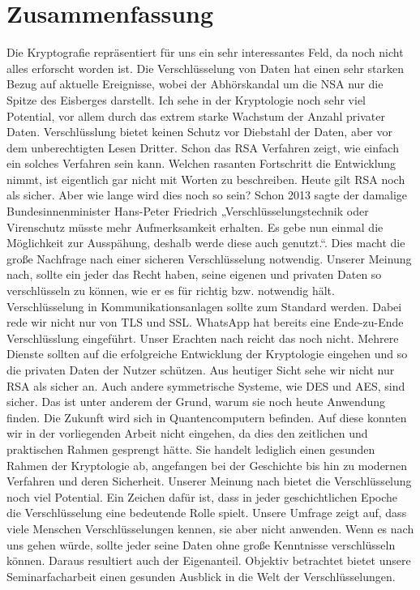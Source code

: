 \chapter{Zusammenfassung}
Die Kryptografie repräsentiert für uns ein sehr interessantes Feld, da noch nicht alles erforscht worden ist. Die Verschlüsselung von Daten hat einen sehr starken Bezug auf aktuelle Ereignisse, wobei der Abhörskandal um die NSA nur die Spitze des Eisberges darstellt. Ich sehe in der Kryptologie noch sehr viel Potential, vor allem durch das extrem starke Wachstum der Anzahl privater Daten. Verschlüsslung bietet keinen Schutz vor Diebstahl der Daten, aber vor dem unberechtigten Lesen Dritter. Schon das RSA Verfahren zeigt, wie einfach ein solches Verfahren sein kann. Welchen rasanten Fortschritt die Entwicklung nimmt, ist eigentlich gar nicht mit Worten zu beschreiben. Heute gilt RSA noch als sicher. Aber wie lange wird dies noch so sein? Schon 2013 sagte der damalige Bundesinnenminister Hans-Peter Friedrich „Verschlüsselungstechnik oder Virenschutz müsste mehr Aufmerksamkeit erhalten. Es gebe nun einmal die Möglichkeit zur Ausspähung, deshalb werde diese auch genutzt.“. Dies macht die große Nachfrage nach einer sicheren Verschlüsselung notwendig. Unserer Meinung nach, sollte ein jeder das Recht haben, seine eigenen und privaten Daten so verschlüsseln zu können, wie er es für richtig bzw. notwendig hält. Verschlüsselung in Kommunikationsanlagen sollte zum Standard werden. Dabei rede wir nicht nur von TLS und SSL. WhatsApp hat bereits eine Ende-zu-Ende Verschlüsslung eingeführt. Unser Erachten nach reicht das noch nicht. Mehrere Dienste sollten auf die erfolgreiche Entwicklung der Kryptologie eingehen und so die privaten Daten der Nutzer schützen. Aus heutiger Sicht sehe wir nicht nur RSA als sicher an. Auch andere symmetrische Systeme, wie DES und AES, sind sicher. Das ist unter anderem der Grund, warum sie noch heute Anwendung finden. Die Zukunft wird sich in Quantencomputern befinden. Auf diese konnten wir in der vorliegenden Arbeit nicht eingehen, da dies den zeitlichen und praktischen Rahmen gesprengt hätte. Sie handelt lediglich einen gesunden Rahmen der Kryptologie ab, angefangen bei der Geschichte bis hin zu modernen Verfahren und deren Sicherheit. Unserer Meinung nach bietet die Verschlüsselung noch viel Potential. Ein Zeichen dafür ist, dass in jeder geschichtlichen Epoche die Verschlüsselung eine bedeutende Rolle spielt. Unsere Umfrage zeigt auf, dass viele Menschen Verschlüsselungen kennen, sie aber nicht anwenden. Wenn es nach uns gehen würde, sollte jeder seine Daten ohne große Kenntnisse verschlüsseln können. Daraus resultiert auch der Eigenanteil. Objektiv betrachtet bietet unsere Seminarfacharbeit einen gesunden Ausblick in die Welt der Verschlüsselungen.